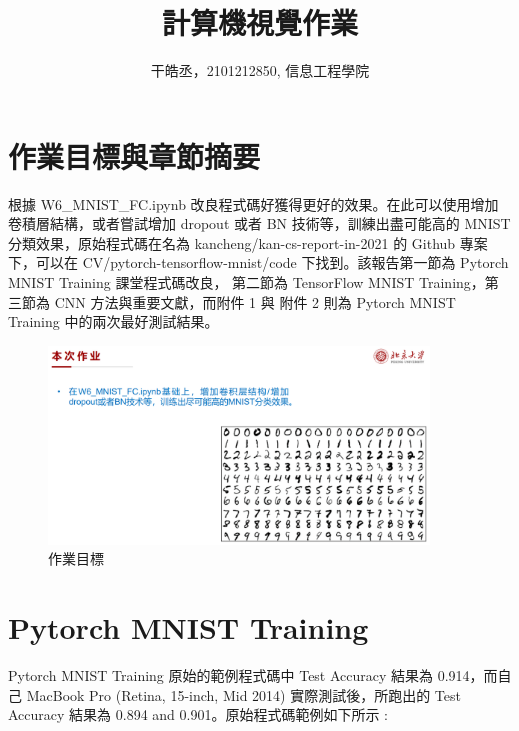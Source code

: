 \documentclass[11pt,UTF8]{ctexart}
\title{計算機視覺作業}
\author{干皓丞，2101212850, 信息工程學院}
\begin{document}
\maketitle


\section{作業目標與章節摘要}

根據 W6\_MNIST\_FC.ipynb 改良程式碼好獲得更好的效果。在此可以使用增加卷積層結構，或者嘗試增加 dropout 或者 BN 技術等，訓練出盡可能高的 MNIST 分類效果，原始程式碼在名為 kancheng/kan-cs-report-in-2021 的 Github 專案下，可以在 CV/pytorch-tensorflow-mnist/code 下找到。該報告第一節為 Pytorch MNIST Training 課堂程式碼改良， 第二節為 TensorFlow MNIST Training，第三節為 CNN 方法與重要文獻，而附件 1 與 附件 2 則為 Pytorch MNIST Training 中的兩次最好測試結果。

\begin{figure}[H]
\centering 
\includegraphics[width=0.9\textwidth]{t1.png} 
\caption{作業目標}
\label{Test}
\end{figure}

\newpage

\section{Pytorch MNIST Training}

Pytorch MNIST Training 原始的範例程式碼中 Test Accuracy 結果為 0.914，而自己 MacBook Pro (Retina, 15-inch, Mid 2014) 實際測試後，所跑出的  Test Accuracy 結果為 0.894 and 0.901。原始程式碼範例如下所示 :
\end{document}
